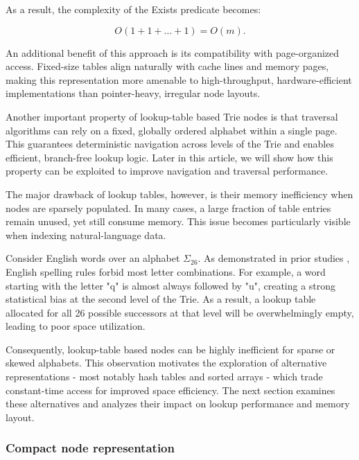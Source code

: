 \documentclass[11pt,twoside]{article}
\begin{document}
    As a result, the complexity of the Exists predicate becomes:

    \begin{equation}
        O(1 + 1 + \dots + 1) = O(m).
    \end{equation}


    An additional benefit of this approach is its compatibility with
    page-organized access. Fixed-size tables align naturally with cache
    lines and memory pages, making this representation more amenable to
    high-throughput, hardware-efficient implementations than pointer-heavy,
    irregular node layouts.

    Another important property of lookup-table based Trie nodes is that
    traversal algorithms can rely on a fixed, globally ordered alphabet
    within a single page. This guarantees deterministic navigation across
    levels of the Trie and enables efficient, branch-free lookup logic.
    Later in this article, we will show how this property can be exploited
    to improve navigation and traversal performance.

    The major drawback of lookup tables, however, is their memory
    inefficiency when nodes are sparsely populated. In many cases, a large
    fraction of table entries remain unused, yet still consume memory. This
    issue becomes particularly visible when indexing natural-language data.

    Consider English words over an alphabet \(\Sigma_{26}\). As demonstrated
    in prior studies \cite{yau2014distribution,norvig2012english}, English spelling rules forbid most letter
    combinations. For example, a word starting with the letter "q" is almost
    always followed by "u", creating a strong statistical bias at the second
    level of the Trie. As a result, a lookup table allocated for all 26
    possible successors at that level will be overwhelmingly empty, leading
    to poor space utilization.

    Consequently, lookup-table based nodes can be highly inefficient for
    sparse or skewed alphabets. This observation motivates the exploration
    of alternative representations - most notably hash tables and sorted
    arrays - which trade constant-time access for improved space efficiency.
    The next section examines these alternatives and analyzes their impact
    on lookup performance and memory layout.

    \subsubsection{Compact node representation}\label{compact-node-representation}
\end{document}
